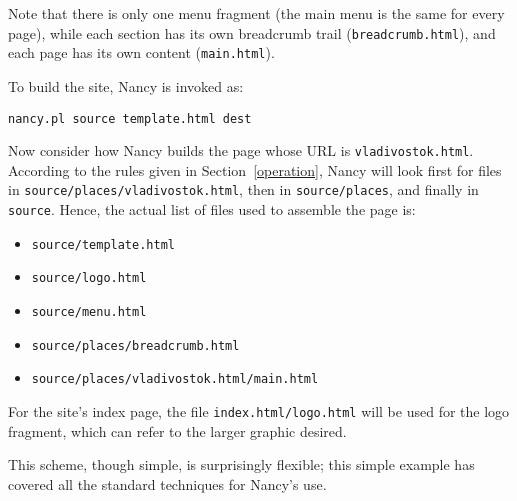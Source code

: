 \documentclass[english]{scrartcl}
\begin{document}
Note that there is only one menu fragment (the main menu is the same for every page), while each section has its own breadcrumb trail (\verb|breadcrumb.html|), and each page has its own content (\verb|main.html|).

To build the site, Nancy is invoked as:

\begin{verbatim}
nancy.pl source template.html dest
\end{verbatim}

Now consider how Nancy builds the page whose URL is \verb|vladivostok.html|. According to the rules given in Section~\ref{operation}, Nancy will look first for files in \verb|source/places/vladivostok.html|, then in \verb|source/places|, and finally in \verb|source|. Hence, the actual list of files used to assemble the page is:

\begin{itemize}
\item \verb|source/template.html|
\item \verb|source/logo.html|
\item \verb|source/menu.html|
\item \verb|source/places/breadcrumb.html|
\item \verb|source/places/vladivostok.html/main.html|
\end{itemize}

For the site’s index page, the file \verb|index.html/logo.html| will be used for the logo fragment, which can refer to the larger graphic desired.

This scheme, though simple, is surprisingly flexible; this simple example has covered all the standard techniques for Nancy’s use.
\end{document}

